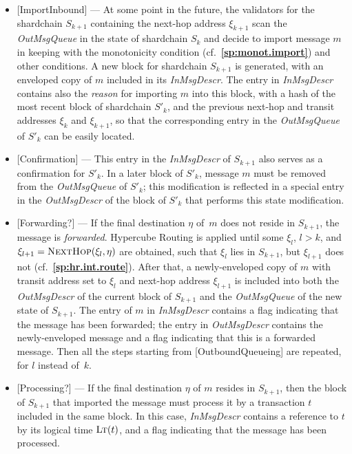 \documentclass[12pt,oneside]{article}
\def\refpoint#1{{\rm\textbf{\ref{#1}}}}
\let\ptref=\refpoint
\def\opsc#1{\operatorname{\textsc{#1}}}
\def\LT{\opsc{Lt}}
\def\NextHop{\opsc{NextHop}}
\begin{document}
\begin{itemize}
\item{[ImportInbound]} --- At some point in the future, the validators for the shardchain $S_{k+1}$ containing the next-hop address $\xi_{k+1}$ scan the {\em OutMsgQueue\/} in the state of shardchain $S_k$ and decide to import message $m$ in keeping with the monotonicity condition (cf.~\ptref{sp:monot.import}) and other conditions. A new block for shardchain $S_{k+1}$ is generated, with an enveloped copy of $m$ included in its {\em InMsgDescr}. The entry in {\em InMsgDescr\/} contains also the {\em reason\/} for importing $m$ into this block, with a hash of the most recent block of shardchain $S'_k$, and the previous next-hop and transit addresses $\xi_k$ and $\xi_{k+1}$, so that the corresponding entry in the {\em OutMsgQueue\/} of $S'_k$ can be easily located.
\item{[Confirmation]} --- This entry in the {\em InMsgDescr\/} of $S_{k+1}$ also serves as a confirmation for $S'_k$. In a later block of $S'_k$, message $m$ must be removed from the {\em OutMsgQueue\/} of $S'_k$; this modification is reflected in a special entry in the {\em OutMsgDescr\/} of the block of $S'_k$ that performs this state modification.
\item{[Forwarding?]} --- If the final destination $\eta$ of~$m$ does not reside in $S_{k+1}$, the message is {\em forwarded}. Hypercube Routing is applied until some $\xi_l$, $l>k$, and $\xi_{l+1}=\NextHop(\xi_l,\eta)$ are obtained, such that $\xi_l$ lies in $S_{k+1}$, but $\xi_{l+1}$ does not (cf.~\ptref{sp:hr.int.route}). After that, a newly-enveloped copy of $m$ with transit address set to $\xi_l$ and next-hop address $\xi_{l+1}$ is included into both the {\em OutMsgDescr\/} of the current block of $S_{k+1}$ and the {\em OutMsgQueue\/} of the new state of $S_{k+1}$. The entry of $m$ in {\em InMsgDescr\/} contains a flag indicating that the message has been forwarded; the entry in {\em OutMsgDescr\/} contains the newly-enveloped message and a flag indicating that this is a forwarded message. Then all the steps starting from [OutboundQueueing] are repeated, for $l$ instead of~$k$.
\item{[Processing?]} --- If the final destination $\eta$ of $m$ resides in $S_{k+1}$, then the block of $S_{k+1}$ that imported the message must process it by a transaction $t$ included in the same block. In this case, {\em InMsgDescr\/} contains a reference to $t$ by its logical time $\LT(t)$, and a flag indicating that the message has been processed.
\end{itemize}
\end{document}
